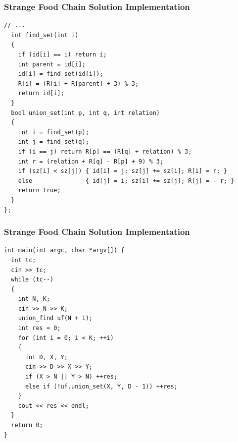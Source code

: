 \documentclass{beamer}
\begin{document}
\begin{frame}[containsverbatim]
\frametitle{Strange Food Chain Solution Implementation}

\scriptsize

\begin{lstlisting}[mathescape]
  // ...
  int find_set(int i)
  {
    if (id[i] == i) return i;
    int parent = id[i];
    id[i] = find_set(id[i]);
    R[i] = (R[i] + R[parent] + 3) % 3;
    return id[i];
  }
  bool union_set(int p, int q, int relation)
  {
    int i = find_set(p);
    int j = find_set(q);
    if (i == j) return R[p] == (R[q] + relation) % 3;
    int r = (relation + R[q] - R[p] + 9) % 3;
    if (sz[i] < sz[j]) { id[i] = j; sz[j] += sz[i]; R[i] = r; }
    else               { id[j] = i; sz[i] += sz[j]; R[j] = - r; }
    return true;
  }
};
\end{lstlisting}

\end{frame}

\begin{frame}[containsverbatim]
\frametitle{Strange Food Chain Solution Implementation}

\scriptsize

\begin{lstlisting}[mathescape]
int main(int argc, char *argv[]) {
  int tc;
  cin >> tc;
  while (tc--)
  {
    int N, K;
    cin >> N >> K;
    union_find uf(N + 1);
    int res = 0;
    for (int i = 0; i < K; ++i)
    {
      int D, X, Y;
      cin >> D >> X >> Y;
      if (X > N || Y > N) ++res;
      else if (!uf.union_set(X, Y, D - 1)) ++res;
    }
    cout << res << endl;
  }
  return 0;
}
\end{lstlisting}

\end{frame}

\end{document}
